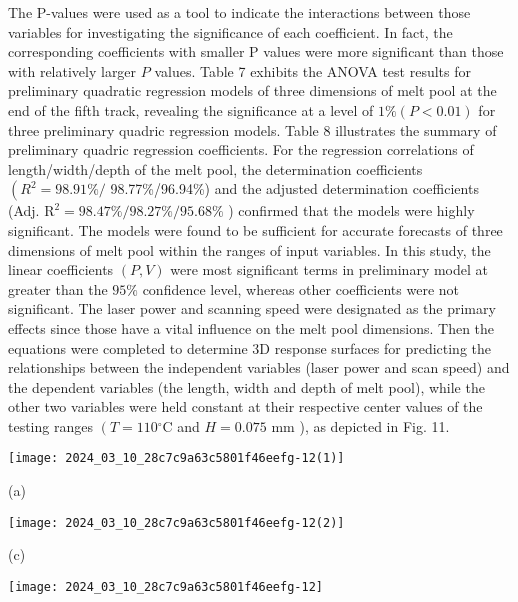 \documentclass[10pt]{article}
\begin{document}
The P-values were used as a tool to indicate the interactions between those variables for investigating the significance of each coefficient. In fact, the corresponding coefficients with smaller $\mathrm{P}$ values were more significant than those with relatively larger $P$ values. Table 7 exhibits the ANOVA test results for preliminary quadratic regression models of three dimensions of melt pool at the end of the fifth track, revealing the significance at a level of $1 \%(P<0.01)$ for three preliminary quadric regression models. Table 8 illustrates the summary of preliminary quadric regression coefficients. For the regression correlations of length/width/depth of the melt pool, the determination coefficients $\left(R^{2}=98.91 \% /\right.$ 98.77\%/96.94\%) and the adjusted determination coefficients (Adj. $\mathrm{R}^{2}=98.47 \% / 98.27 \% / 95.68 \%$ ) confirmed that the models were highly significant. The models were found to be sufficient for accurate forecasts of three dimensions of melt pool within the ranges of input variables. In this study, the linear coefficients $(P, V)$ were most significant terms in preliminary model at greater than the $95 \%$ confidence level, whereas other coefficients were not significant. The laser power and scanning speed were designated as the primary effects since those have a vital influence on the melt pool dimensions. Then the equations were completed to determine 3D response surfaces for predicting the relationships between the independent variables (laser power and scan speed) and the dependent variables (the length, width and depth of melt pool), while the other two variables were held constant at their respective center values of the testing ranges $\left(T=110{ }^{\circ} \mathrm{C}\right.$ and $H=0.075$ $\mathrm{mm}$ ), as depicted in Fig. 11.

\begin{center}
\texttt{[image: 2024\_03\_10\_28c7c9a63c5801f46eefg-12(1)]}
\end{center}

(a)

\begin{center}
\texttt{[image: 2024\_03\_10\_28c7c9a63c5801f46eefg-12(2)]}
\end{center}

(c)

\begin{center}
\texttt{[image: 2024\_03\_10\_28c7c9a63c5801f46eefg-12]}
\end{center}
\end{document}
